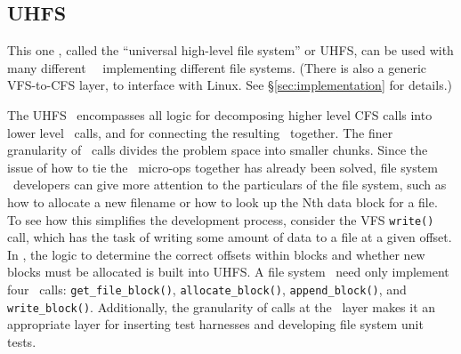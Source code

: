 \subsection{UHFS}
\label{sec:modules:uhfs}

This one \module, called the ``universal high-level file system'' or
UHFS, can be used with many different \LFS\ \modules\ implementing different file
systems. (There is also a generic VFS-to-CFS layer, to interface with Linux. See
\S\ref{sec:implementation} for details.)

The UHFS \module\ encompasses all logic for decomposing higher level CFS calls
into lower level \LFS\ calls, and for connecting the resulting \chdescs\
together. The finer granularity of \LFS\ calls divides the problem space into
smaller chunks. Since the issue of how to tie the \LFS\ micro-ops together has
already been solved, file system \module\ developers can give more attention to
the particulars of the file system, such as how to allocate a new filename or
how to look up the Nth data block for a file. To see how this simplifies the
development process, consider the VFS \texttt{write()} call, which has the task
of writing some amount of data to a file at a given offset. In \Kudos, the logic
to determine the correct offsets within blocks and whether new blocks must be
allocated is built into UHFS. A file system \module\ need only implement four
\LFS\ calls: \texttt{get\_file\_block()}, \texttt{allocate\_block()},
\texttt{append\_block()}, and \texttt{write\_block()}. Additionally, the
granularity of calls at the \LFS\ layer makes it an appropriate layer for
inserting test harnesses and developing file system unit tests.
